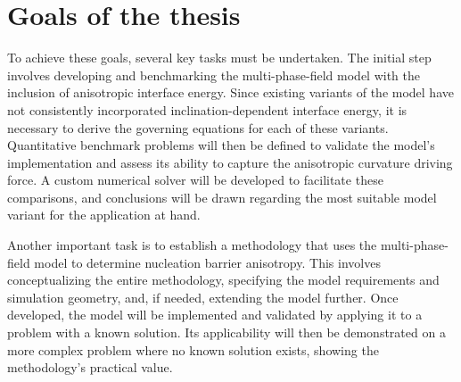 \section{Goals of the thesis}

\noindent{}



To achieve these goals, several key tasks must be undertaken. The initial step involves developing and benchmarking the multi-phase-field model with the inclusion of anisotropic interface energy. Since existing variants of the model have not consistently incorporated inclination-dependent interface energy, it is necessary to derive the governing equations for each of these variants. Quantitative benchmark problems will then be defined to validate the model's implementation and assess its ability to capture the anisotropic curvature driving force. A custom numerical solver will be developed to facilitate these comparisons, and conclusions will be drawn regarding the most suitable model variant for the application at hand.

Another important task is to establish a methodology that uses the multi-phase-field model to determine nucleation barrier anisotropy. This involves conceptualizing the entire methodology, specifying the model requirements and simulation geometry, and, if needed, extending the model further. Once developed, the model will be implemented and validated by applying it to a problem with a known solution. Its applicability will then be demonstrated on a more complex problem where no known solution exists, showing the methodology’s practical value.

